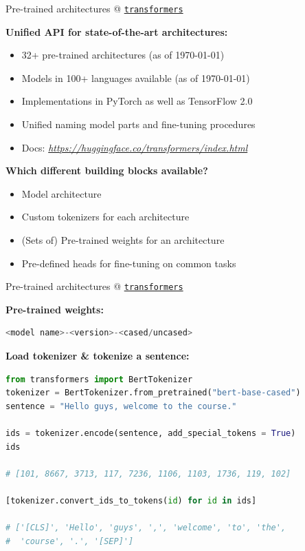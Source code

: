 \documentclass[]{beamer}
\begin{document}
\begin{frame}{Pre-trained architectures @ \href{https://github.com/huggingface/transformers}{\texttt{transformers}}}

\textbf{Unified API for state-of-the-art architectures:}

\begin{itemize}
	\item 32+ pre-trained architectures (as of \today)
	\item Models in 100+ languages available (as of \today)
	\item Implementations in PyTorch as well as TensorFlow 2.0
	\item Unified naming model parts and fine-tuning procedures
	\item Docs: \href{https://huggingface.co/transformers/index.html}{\textit{https://huggingface.co/transformers/index.html}}
\end{itemize}

\vspace{.3cm}

\textbf{Which different building blocks available?}

\begin{itemize}
	\item Model architecture
	\item Custom tokenizers for each architecture
	\item (Sets of) Pre-trained weights for an architecture
	\item Pre-defined heads for fine-tuning on common tasks
\end{itemize}
\end{frame}



\begin{frame}[fragile]{Pre-trained architectures @ \href{https://github.com/huggingface/transformers}{\texttt{transformers}}}

\textbf{Pre-trained weights:}
\vspace{-.2cm}
\begin{lstlisting}[language=Python]
<model name>-<version>-<cased/uncased>
\end{lstlisting}

\vspace{.3cm}

\textbf{Load tokenizer \& tokenize a sentence:}
\vspace{-.2cm}
\begin{lstlisting}[language=Python]
from transformers import BertTokenizer
tokenizer = BertTokenizer.from_pretrained("bert-base-cased")
sentence = "Hello guys, welcome to the course."

ids = tokenizer.encode(sentence, add_special_tokens = True)
ids

# [101, 8667, 3713, 117, 7236, 1106, 1103, 1736, 119, 102]

[tokenizer.convert_ids_to_tokens(id) for id in ids]

# ['[CLS]', 'Hello', 'guys', ',', 'welcome', 'to', 'the', 
#  'course', '.', '[SEP]']
\end{lstlisting}
\end{frame}
\end{document}
